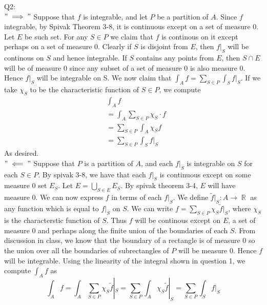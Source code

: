\documentclass[letterpaper]{article}
\DeclareMathOperator{\R}{\mathbb{R}}
\begin{document}
Q2:\\ $"\implies"$ Suppose that $f$ is integrable, and let $P$ be a partition of $A$. Since $f$ integrable, by Spivak Theorem 3-8, it is continuous except on a set of measure 0. Let $E$ be such set. For any $S\in P$ we claim that $f$ is continous on it except perhaps on a set of measure 0.
 Clearly if $S$ is disjoint from $E$, then $f|_S$ will be continous on $S$ and hence integrable. If $S$ contains any points from $E$, then $S\cap E$ will be of measure 0 since any subset of a set of measure 0 is also measure 0. 
 Hence $f|_S$ will be integrable on S. We now claim that $\int_A f = \sum_{S\in P} \int_S f|_S$. If we take $\chi_S$ to be the characteristic function of $S\in P$, we compute 
\begin{align*}
   & \int_A f
   \\ & = \int_A \sum_{S\in P} \chi_S \cdot f \tag*{rewriting f as sum of its restrictions}
   \\ & = \sum_{S\in P} \int_A \chi_S f \tag*{by question 1}
   \\ & = \sum_{S\in P} \int_S f|_S
\end{align*} As desired. 
\\ $"\impliedby"$ Suppose that $P$ is a partition of $A$, and each $f|_S$ is integrable on $S$ for each $S\in P$. By spivak 3-8, we have that each $f|_S$ is continuous except on some measure 0 set $E_S$. Let $E = \bigcup_{S\in E} E_S$. By spivak theorem 3-4, $E$ will have measure 0. We can now express $f$ in terms of each $f|_S$. We define $\tilde{f}|_S:A\rightarrow \R$ as any function which is equal to $f|_S$ on $S$. 
We can write $f = \sum_{S\in P} \chi_S \tilde{f}|_S$, where $\chi_S$ is the characterstic function of $S$. Thus $f$ will be continous except on $E$, a set of measure 0 and perhaps along the finite union of the boundaries of each $S$.
 From discussion in class, we know that the boundary of a rectangle is of measure 0 so the union over all the boundaries of subrectangles of $P$ will be measure 0. Hence $f$ will be integrable. Using the linearity of the integral shown in question 1, we compute 
 $\int_A f$ as $$\int_A f = \int_A \sum_{S\in P} \chi_S \tilde{f}|_S = \sum_{S\in P}\int_A \chi_S \tilde{f}|_S = \sum_{S\in P } \int_S f|_S$$
\end{document}
